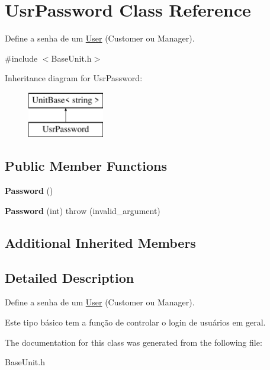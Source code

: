 \hypertarget{classUsrPassword}{\section{Usr\-Password Class Reference}
\label{classUsrPassword}
}


Define a senha de um \hyperlink{classUser}{User} (Customer ou Manager).  




{\ttfamily \#include $<$Base\-Unit.\-h$>$}

Inheritance diagram for Usr\-Password\-:\begin{figure}[H]
\begin{center}
\leavevmode
\includegraphics[height=2.000000cm]{classUsrPassword}
\end{center}
\end{figure}
\subsection*{Public Member Functions}
\begin{DoxyCompactItemize}
\item 
\hypertarget{classUsrPassword_ad08a7c4a7e940186d4d23a5347ea7080}{{\bfseries Password} ()}\label{classUsrPassword_ad08a7c4a7e940186d4d23a5347ea7080}

\item 
\hypertarget{classUsrPassword_a42ff4b71c0c413ae5db79ea2697cc7a6}{{\bfseries Password} (int)  throw (invalid\-\_\-argument)}\label{classUsrPassword_a42ff4b71c0c413ae5db79ea2697cc7a6}

\end{DoxyCompactItemize}
\subsection*{Additional Inherited Members}


\subsection{Detailed Description}
Define a senha de um \hyperlink{classUser}{User} (Customer ou Manager). 

Este tipo básico tem a função de controlar o login de usuários em geral. 

The documentation for this class was generated from the following file\-:\begin{DoxyCompactItemize}
\item 
Base\-Unit.\-h\end{DoxyCompactItemize}
